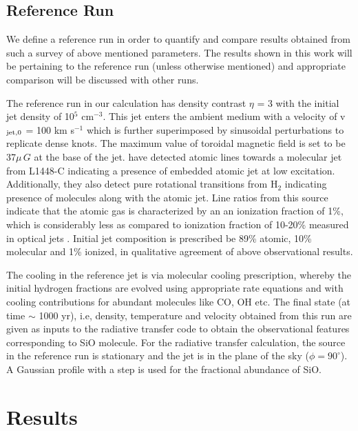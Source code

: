 \documentclass[useAMS,usenatbib]{mn2e}
\begin{document}
\subsection{Reference Run}
\label{ssec:refrun}
We define a reference run in order to quantify and compare results obtained from such a
survey of above mentioned parameters. The results shown in this work will be
pertaining to the reference run (unless otherwise mentioned) and appropriate comparison will be
discussed with other runs. 

The reference run in our calculation has density contrast $\eta$ = 3
with the initial jet density of 10$^{5}$ cm$^{-3}$. This jet enters the
ambient medium with a velocity of v$_{\rm jet,0}$ = 100 km
s$^{-1}$ which is further superimposed by sinusoidal perturbations to
replicate dense knots. The maximum value of toroidal magnetic field is
set to be 37$\mu\,G$ at the base of the jet.
\cite{Dionatos:2009p15670} have detected atomic lines
towards a molecular jet from L1448-C indicating a presence of embedded
atomic jet at low excitation. Additionally, they also detect pure
rotational transitions from H$_{2}$ indicating presence of molecules
along with the atomic jet. Line ratios from this source indicate that the
atomic gas is characterized by an an ionization fraction of 1\%,
which is considerably less as compared to ionization fraction of
10-20\% measured in optical jets \citep{Bacciotti:1995p15970}.
Initial jet composition is prescribed
be 89\% atomic, 10\% molecular and 1\% ionized, in qualitative
agreement of above observational results. 
%

The cooling in the reference jet is via molecular cooling prescription, whereby
the initial hydrogen fractions are evolved using appropriate rate equations and with cooling 
contributions for abundant molecules like CO, OH
etc. The final state (at time $\sim$ 1000 yr), i.e, density, temperature and velocity obtained from this 
run are given as inputs to the radiative transfer code to obtain the observational features
corresponding to SiO molecule. 
For the radiative transfer calculation, the source in the reference
run is stationary and the jet is in the plane of the sky ($\phi =
90^{\circ}$). A Gaussian profile with a step is used for the fractional abundance
of SiO. 

\section{Results}
\label{sec:results}
\end{document}
